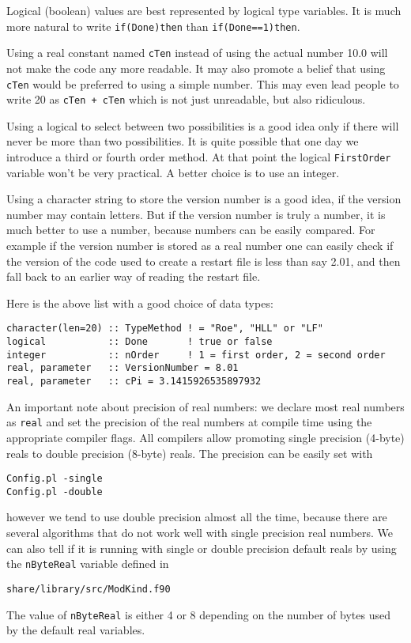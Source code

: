 \documentclass{article}
\begin{document}
Logical (boolean) values are best represented by logical type variables.
It is much more natural to write {\tt if(Done)then} than 
{\tt if(Done==1)then}. 

Using a real constant named {\tt cTen} instead
of using the actual number 10.0 will not make the code any more readable.
It may also promote a belief that using {\tt cTen} would be preferred to
using a simple number. This may even lead people to write 20 as 
{\tt cTen + cTen} which is not just unreadable, but also ridiculous.

Using a logical to select between two possibilities
is a good idea only if there will never be more than two possibilities.
It is quite possible that one day we introduce a third or fourth order
method. At that point the logical {\tt FirstOrder} variable won't be 
very practical. A better choice is to use an integer. 

Using a character string to store the version number is a good idea,
if the version number may contain letters. But if the version number 
is truly a number, it is much better to use a number, because numbers can
be easily compared. For example if the version number is stored
as a real number one can easily check if the version of the code
used to create a restart file is less than say 2.01, and then fall back
to an earlier way of reading the restart file.

Here is the above list with a good choice of data types:
\begin{verbatim}
character(len=20) :: TypeMethod ! = "Roe", "HLL" or "LF"
logical           :: Done       ! true or false
integer           :: nOrder     ! 1 = first order, 2 = second order
real, parameter   :: VersionNumber = 8.01
real, parameter   :: cPi = 3.1415926535897932
\end{verbatim}
An important note about precision of real numbers: we declare
most real numbers as {\tt real} and set the precision of the
real numbers at compile time using the appropriate compiler flags.
All compilers allow promoting single precision (4-byte) reals to 
double precision (8-byte) reals. The precision can be easily set with
\begin{verbatim}
Config.pl -single
Config.pl -double
\end{verbatim}
however we tend to use double precision almost all the time, because
there are several algorithms that do not work well with single precision
real numbers. We can also tell if it is running with single or
double precision default reals by using the {\tt nByteReal} variable
defined in
\begin{verbatim}
share/library/src/ModKind.f90
\end{verbatim}
The value of {\tt nByteReal} is either 4 or 8 depending on 
the number of bytes used by the default real variables.
\end{document}
